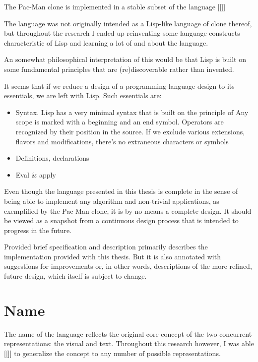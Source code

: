 The Pac-Man clone is implemented in a stable subset of the language [[]]

The language was not originally intended as a Lisp-like language of clone thereof, but throughout the research I ended up reinventing some language constructs characteristic of Lisp and learning a lot of and about the language.

An somewhat philosophical interpretation of this would be that Lisp is built on some fundamental principles that are (re)discoverable rather than invented.


It seems that if we reduce a design of a programming language design to its essentials, we are left with Lisp. Such essentials are:
\begin{itemize}
    \item Syntax. Lisp has a very minimal syntax that is built on the principle of %
    Any scope is marked with a beginning and an end symbol. Operators are recognized by their position in the source. If we exclude various extensions, flavors and modifications, there's no extraneous characters or symbols
    \item Definitions, declarations
    \item Eval \& apply
\end{itemize}

Even though the language presented in this thesis is complete in the sense of being able to implement any algorithm and non-trivial applications, as exemplified by the Pac-Man clone, it is by no means a complete design. It should be viewed as a snapshot from a continuous design process that is intended to progress in the future.

Provided brief specification and description primarily describes the implementation provided with this thesis. But it is also annotated with suggestions for improvements or, in other words, descriptions of the more refined, future design, which itself is subject to change.

\section{Name}
The name of the language reflects the original core concept of the two concurrent representations: the visual and text. Throughout this research however, I was able [[]] to generalize the concept to any number of possible representations.


